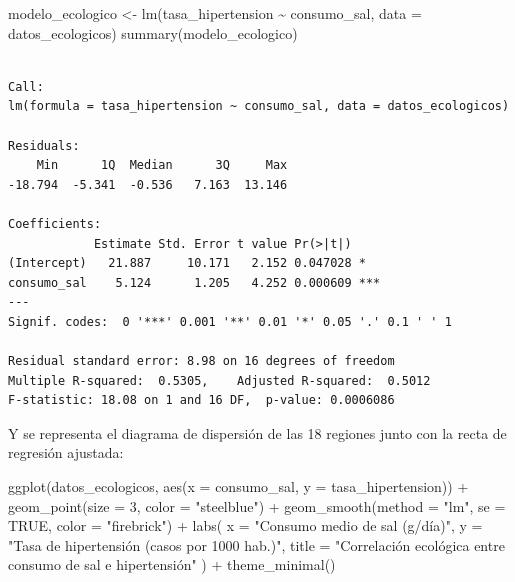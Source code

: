 \documentclass[
  spanish,
  a4paper,
]{scrreport}
\newenvironment{Shaded}{\begin{snugshade}}{\end{snugshade}}
\newcommand{\AttributeTok}[1]{\textcolor[rgb]{0.40,0.45,0.13}{#1}}
\newcommand{\ConstantTok}[1]{\textcolor[rgb]{0.56,0.35,0.01}{#1}}
\newcommand{\DecValTok}[1]{\textcolor[rgb]{0.68,0.00,0.00}{#1}}
\newcommand{\FunctionTok}[1]{\textcolor[rgb]{0.28,0.35,0.67}{#1}}
\newcommand{\NormalTok}[1]{\textcolor[rgb]{0.00,0.23,0.31}{#1}}
\newcommand{\OtherTok}[1]{\textcolor[rgb]{0.00,0.23,0.31}{#1}}
\newcommand{\SpecialCharTok}[1]{\textcolor[rgb]{0.37,0.37,0.37}{#1}}
\newcommand{\StringTok}[1]{\textcolor[rgb]{0.13,0.47,0.30}{#1}}
\theoremstyle{definition}
\theoremstyle{definition}
\theoremstyle{remark}
\begin{document}
\begin{Shaded}
\begin{Highlighting}[]
\NormalTok{modelo\_ecologico }\OtherTok{\textless{}{-}} \FunctionTok{lm}\NormalTok{(tasa\_hipertension }\SpecialCharTok{\textasciitilde{}}\NormalTok{ consumo\_sal, }\AttributeTok{data =}\NormalTok{ datos\_ecologicos)}
\FunctionTok{summary}\NormalTok{(modelo\_ecologico)}
\end{Highlighting}
\end{Shaded}

\begin{verbatim}

Call:
lm(formula = tasa_hipertension ~ consumo_sal, data = datos_ecologicos)

Residuals:
    Min      1Q  Median      3Q     Max 
-18.794  -5.341  -0.536   7.163  13.146 

Coefficients:
            Estimate Std. Error t value Pr(>|t|)    
(Intercept)   21.887     10.171   2.152 0.047028 *  
consumo_sal    5.124      1.205   4.252 0.000609 ***
---
Signif. codes:  0 '***' 0.001 '**' 0.01 '*' 0.05 '.' 0.1 ' ' 1

Residual standard error: 8.98 on 16 degrees of freedom
Multiple R-squared:  0.5305,    Adjusted R-squared:  0.5012 
F-statistic: 18.08 on 1 and 16 DF,  p-value: 0.0006086
\end{verbatim}

Y se representa el diagrama de dispersión de las 18 regiones junto con
la recta de regresión ajustada:

\begin{Shaded}
\begin{Highlighting}[]
\FunctionTok{ggplot}\NormalTok{(datos\_ecologicos, }\FunctionTok{aes}\NormalTok{(}\AttributeTok{x =}\NormalTok{ consumo\_sal, }\AttributeTok{y =}\NormalTok{ tasa\_hipertension)) }\SpecialCharTok{+}
  \FunctionTok{geom\_point}\NormalTok{(}\AttributeTok{size =} \DecValTok{3}\NormalTok{, }\AttributeTok{color =} \StringTok{"steelblue"}\NormalTok{) }\SpecialCharTok{+}
  \FunctionTok{geom\_smooth}\NormalTok{(}\AttributeTok{method =} \StringTok{"lm"}\NormalTok{, }\AttributeTok{se =} \ConstantTok{TRUE}\NormalTok{, }\AttributeTok{color =} \StringTok{"firebrick"}\NormalTok{) }\SpecialCharTok{+}
  \FunctionTok{labs}\NormalTok{(}
    \AttributeTok{x =} \StringTok{"Consumo medio de sal (g/día)"}\NormalTok{,}
    \AttributeTok{y =} \StringTok{"Tasa de hipertensión (casos por 1000 hab.)"}\NormalTok{,}
    \AttributeTok{title =} \StringTok{"Correlación ecológica entre consumo de sal e hipertensión"}
\NormalTok{  ) }\SpecialCharTok{+}
  \FunctionTok{theme\_minimal}\NormalTok{()}
\end{Highlighting}
\end{Shaded}
\end{document}
